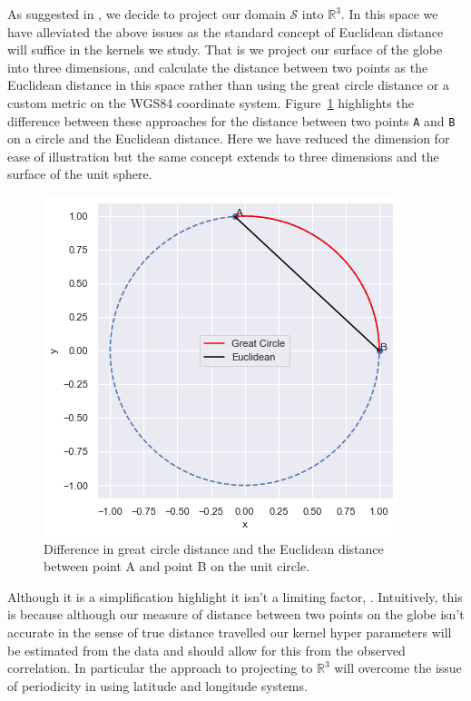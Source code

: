 As suggested in \citep{guinness_isotropic_2016}, we decide to project our domain $\mathcal{S}$ into $\mathbb{R}^3$.
In this space we have alleviated the above issues as the standard concept of Euclidean distance will suffice in the kernels we study.
That is we project our surface of the globe into three dimensions, and calculate the distance between two points as the Euclidean distance in this space rather than using the great circle distance or a custom metric on the WGS84 coordinate system. 
Figure~\ref{fig:spatial_projection} highlights the difference between these approaches for the distance between two points \verb*|A| and \verb*|B| on a circle and the Euclidean distance.
Here we have reduced the dimension for ease of illustration but the same concept extends to three dimensions and the surface of the unit sphere. 

\begin{figure}[h]
	\centering
	\includegraphics[width=\textwidth]{spatial_projection}
	\caption[Difference in great circle distance and the Euclidean distance in $\mathbb{R}^2$ ]{Difference in great circle distance and the Euclidean distance between point A and point B on the unit circle.}
	\label{fig:spatial_projection}
\end{figure}

Although it is a simplification \citep{guinness_isotropic_2016} highlight it isn't a limiting factor, \citep{guinness_isotropic_2016}. 
Intuitively, this is because although our measure of distance between two points on the globe isn't accurate in the sense of true distance travelled our kernel hyper parameters will be estimated from the data and should allow for this from the observed correlation.
In particular the approach to projecting to $\mathbb{R}^3$ will overcome the issue of periodicity in using latitude and longitude systems.

